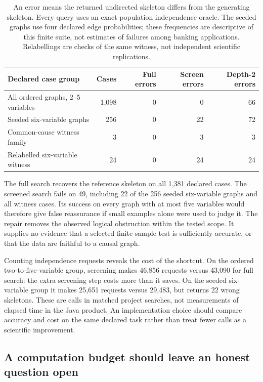 \begin{table}[htbp]
\centering\small
\begin{tabular}{lrrrr}
\toprule
Declared case group & Cases & Full errors & Screen errors & Depth-2 errors\\
\midrule
All ordered graphs, 2--5 variables & 1,098 & 0 & 0 & 66\\
Seeded six-variable graphs & 256 & 0 & 22 & 72\\
Common-cause witness family & 3 & 0 & 3 & 3\\
Relabelled six-variable witness & 24 & 0 & 24 & 24\\
\bottomrule
\end{tabular}
\caption{An error means the returned undirected skeleton differs from the
generating skeleton. Every query uses an exact population independence
oracle. The seeded graphs use four declared edge probabilities; these
frequencies are descriptive of this finite suite, not estimates of failures
among banking applications. Relabellings are checks of the same witness,
not independent scientific replications.}
\label{repair29:results}
\end{table}

The full search recovers the reference skeleton on all 1,381 declared cases.
The screened search fails on 49, including 22 of the 256 seeded six-variable
graphs and all witness cases. Its success on every graph with at most five
variables would therefore give false reassurance if small examples alone
were used to judge it. The repair removes the observed logical obstruction
within the tested scope. It supplies no evidence that a selected finite-sample
test is sufficiently accurate, or that the data are faithful to a causal graph.

Counting independence requests reveals the cost of the shortcut. On the
ordered two-to-five-variable group, screening makes 46,856 requests versus
43,090 for full search: the extra screening step costs more than it saves.
On the seeded six-variable group it makes 25,651 requests versus 29,483,
but returns 22 wrong skeletons. These are calls in matched project searches,
not measurements of elapsed time in the Java product. An implementation
choice should compare accuracy and cost on the same declared task rather
than treat fewer calls as a scientific improvement.

\subsection{A computation budget should leave an honest question open}

